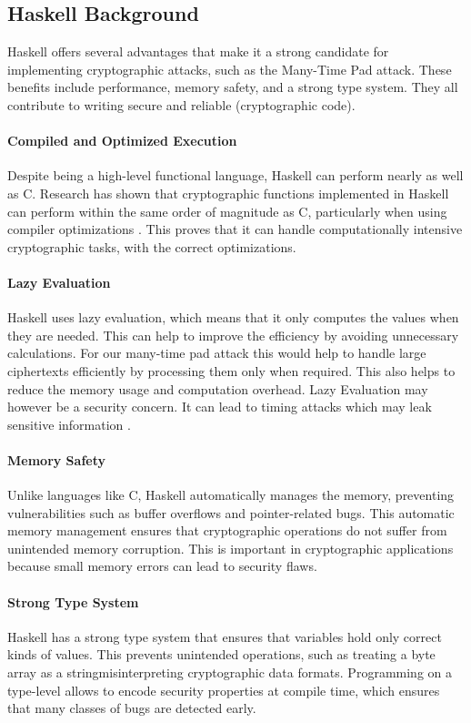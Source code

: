 \subsection{Haskell Background}
\label{sec:why_haskell}
Haskell offers several advantages that make it a strong candidate for implementing cryptographic attacks, 
such as the Many-Time Pad attack. These benefits include performance, memory safety, and a strong type system. 
They all contribute to writing secure and reliable (cryptographic code). 

\paragraph{Compiled and Optimized Execution} 
Despite being a high-level functional language, Haskell can perform nearly as well as C. 
Research has shown that cryptographic functions implemented in Haskell can perform within the same order of magnitude as C, 
particularly when using compiler optimizations \cite{tevis2006secure}. 
This proves that it can handle computationally intensive cryptographic tasks, with the correct optimizations.

\paragraph{Lazy Evaluation} 
Haskell uses lazy evaluation, which means that it only computes the values when they are needed. 
This can help to improve the efficiency by avoiding unnecessary calculations. 
For our many-time pad attack this would help to handle large ciphertexts efficiently by processing them only when required. 
This also helps to reduce the memory usage and computation overhead.
Lazy Evaluation may however be a security concern. It can lead to timing attacks which may leak sensitive information \cite{lazy2013}.

\paragraph{Memory Safety}
Unlike languages like C, Haskell automatically manages the memory, preventing vulnerabilities such as buffer overflows and pointer-related bugs. 
This automatic memory management ensures that cryptographic operations do not suffer from unintended memory corruption. 
This is important in cryptographic applications because small memory errors can lead to security flaws. 

\paragraph{Strong Type System}
Haskell has a strong type system that ensures that variables hold only correct kinds of values. 
This prevents unintended operations, such as treating a byte array as a stringmisinterpreting cryptographic data formats. 
Programming on a type-level allows to encode security properties at compile time, which ensures that many classes of bugs are detected early.

